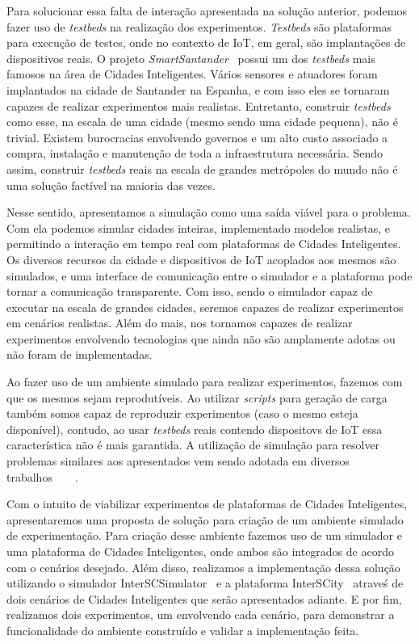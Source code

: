 Para solucionar essa falta de interação apresentada na solução anterior, podemos fazer uso de \textit{testbeds} na realização dos experimentos.
\textit{Testbeds} são plataformas para execução de testes, onde no contexto de IoT, em geral, são implantações de dispositivos reais.
O projeto \textit{SmartSantander}~\cite{sanchez_2014} possui um dos \textit{testbeds} mais famosos na área de Cidades Inteligentes.
Vários sensores e atuadores foram implantados na cidade de Santander na Espanha, e com isso eles se tornaram capazes de realizar experimentos mais realistas.
Entretanto, construir \textit{testbeds} como esse, na escala de uma cidade (mesmo sendo uma cidade pequena), não é trivial.
Existem burocracias envolvendo governos e um alto custo associado a compra, instalação e manutenção de toda a infraestrutura necessária.
Sendo assim, construir \textit{testbeds} reais na escala de grandes metrópoles do mundo não é uma solução factível na maioria das vezes.

Nesse sentido, apresentamos a simulação como uma saída viável para o problema.
Com ela podemos simular cidades inteiras, implementado modelos realistas, e permitindo a interação em tempo real com plataformas de Cidades Inteligentes.
Os diversos recursos da cidade e dispositivos de IoT acoplados aos mesmos são simulados, e uma interface de comunicação entre o simulador e a plataforma pode tornar a comunicação transparente.
Com isso, sendo o simulador capaz de executar na escala de grandes cidades, seremos capazes de realizar experimentos em cenários realistas.
Além do mais, nos tornamos capazes de realizar experimentos envolvendo tecnologias que ainda não são amplamente adotas ou não foram de implementadas.

Ao fazer uso de um ambiente simulado para realizar experimentos, fazemos com que os mesmos sejam reprodutíveis.
Ao utilizar \textit{scripts} para geração de carga também somos capaz de reproduzir experimentos (caso o mesmo esteja disponível), contudo, ao usar \textit{testbeds} reais contendo dispositovs de IoT
essa característica não é mais garantida.
A utilização de simulação para resolver problemas similares aos apresentados vem sendo adotada em diversos trabalhos~\cite{karnouskos_2009}~\cite{fleischer_1994}~\cite{dupuy_1990}~\cite{boukerche_2001}.

Com o intuito de viabilizar experimentos de plataformas de Cidades Inteligentes, apresentaremos uma proposta de solução para criação de um ambiente simulado de experimentação.
Para criação desse ambiente fazemos uso de um simulador e uma plataforma de Cidades Inteligentes, onde ambos são integrados de acordo com o cenários desejado.
Além disso, realizamos a implementação dessa solução utilizando o simulador InterSCSimulator~\cite{santana_17} e a plataforma InterSCity~\cite{arthur_17} atraveś de dois cenários de Cidades Inteligentes
que serão apresentados adiante.
E por fim, realizamos dois experimentos, um envolvendo cada cenário, para demonstrar a funcionalidade do ambiente construído e validar a implementação feita.

